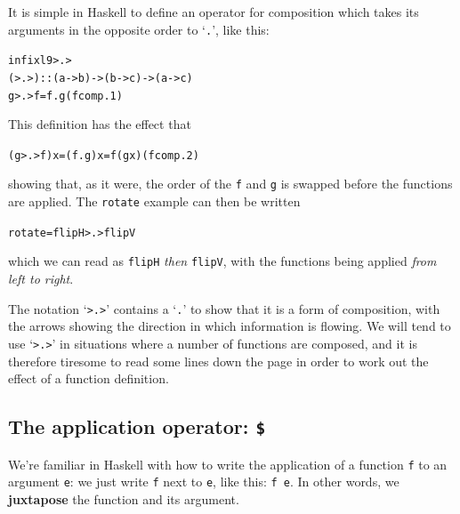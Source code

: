 It is simple in Haskell to define an operator for composition which takes its
arguments in the opposite order to `\texttt{.}', like this:
\begin{alltt}
infixl 9 >.>
\bl
(>.>) :: (a -> b) -> (b -> c) -> (a -> c)
\bl
g >.> f = f . g\hfill(fcomp.1)
\end{alltt}
This definition has the effect that
\begin{alltt}
(g >.> f) x = (f.g) x = f (g x)\hfill(fcomp.2)
\end{alltt}
showing that, as it were, the order of the \texttt{f} and \texttt{g} is swapped
before the functions are applied.
The \texttt{rotate} example can then be written
\begin{alltt}
rotate = flipH >.> flipV  
\end{alltt}
which we can read as \texttt{flipH} {\em then\/} \texttt{flipV}, with the
functions being applied \emph{from left to right}. 

The notation `\texttt{>.>}' contains a `\texttt{.}' to show that it is a form of
composition, with the arrows showing the direction in which information is
flowing. We will tend to use `\texttt{>.>}' in situations where a number
of functions are composed, and it is therefore tiresome to read some
lines down the page in order to work out the effect of a function
definition.






\subsection*{The application operator: \texttt{\$}}\minx{\$}

We're familiar in Haskell with how to write the application of a function \texttt{f} to an argument \texttt{e}: we just write \texttt{f} next to \texttt{e}, like this: \texttt{f e}. In other words, we \textbf{juxtapose} the function and its argument.

